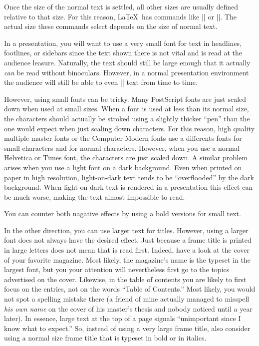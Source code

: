 Once the size of the normal text is settled, all other sizes are
usually defined relative to that size. For this reason, \LaTeX\ has 
commands like |\large| or |\small|. The actual size these commands
select depends on the size of normal text.

In a presentation, you will want to use a very small font for text in
headlines, footlines, or sidebars since the text shown there is not
vital and is read at the audience leasure. Naturally, the text should
still be large enough that it actually \emph{can} be read without
binoculars. However, in a normal presentation environment the audience
will still be able to even |\tiny| text from time to time.

However, using small fonts can be tricky. Many PostScript fonts are
just scaled down when used at small sizes. When a font is
used at less than its normal size, the characters should actually be
stroked using a slightly thicker ``pen'' than the one would expect
when just scaling down characters. For this reason, high quality
multiple master fonts or the Computer Modern fonts use a differents
fonts for small characters and for normal characters. However, when
you use a normal Helvetica or Times font, the characters are just
scaled down. A similar problem arises when you use a light font on a
dark background. Even when printed on paper in high resolution,
light-on-dark text tends to be ``overflooded'' by the dark
background. When light-on-dark text is rendered in a presentation this
effect can be much worse, making the text almost impossible to read.

You can counter both nagative effects by using a bold versions for
small text.

In the other direction, you can use larger text for titles. However,
using a larger font does not always have the desired effect. Just
because a frame title is printed in large letters does not
mean that is read first. Indeed, have a look at the cover of your
favorite magazine. Most likely, the magazine's name is the typeset in the
largest font, but you your attention will nevertheless first go to the
topics advertised on the cover. Likewise, in the table of contents you
are likely to first focus on the entries, not on the words ``Table of
Contents.'' Most likely, you would not spot a spelling mistake there
(a friend of mine actually managed to misspell \emph{his own name} on
the cover of his master's thesis and nobody noticed until a year
later). In essence, large text at the top of a page signals
``unimportant since I know what to expect.'' So, instead of using a
very large frame title, also consider using a normal size frame title
that is typeset in bold or in italics. 





